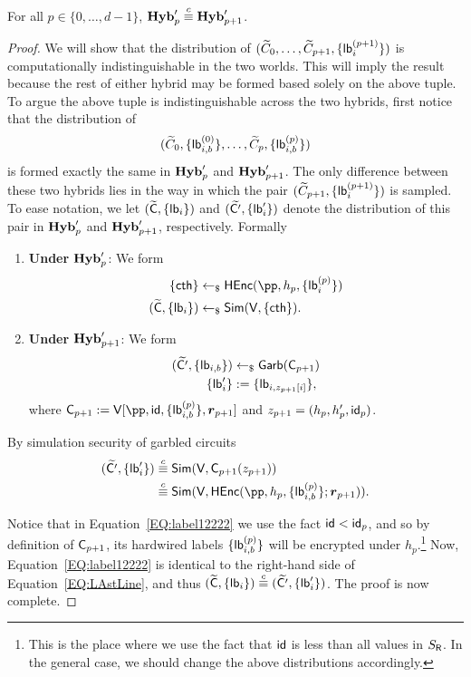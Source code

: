  \begin{lemma}
 For all $p \in \{0, \dots, d-1\}$, $\mathsf{\mathbf{Hyb}}'_p \stackrel{c}{\equiv} \mathsf{\mathbf{Hyb}}'_{p+1}$.
 \end{lemma}
 \begin{proof}
 We will show that the distribution of $(\widetilde{C}_0, \dots, \widetilde{C}_{p+1} , \{\mathsf{lb}^{(p+1)}_i \})$ is computationally indistinguishable in the two worlds.  This will imply the result because  the rest of either hybrid may be formed based solely on the above tuple. To argue the above tuple is indistinguishable across the two hybrids, first notice that the distribution of $$(\widetilde{C}_0, \{\mathsf{lb}^{(0)}_{i,b} \} , \dots, \widetilde{C}_p, \{\mathsf{lb}^{(p)}_{i,b} \})$$ is formed exactly the same in $\mathsf{\mathbf{Hyb}}'_p$ and $\mathsf{\mathbf{Hyb}}'_{p+1}$. The only difference between these two hybrids lies in the way in which the pair $(\widetilde{C}_{p+1}, \{\mathsf{lb}^{(p+1)}_i\})$ is sampled. To ease notation, we let $(\widetilde{\mathsf{C}} , \{\mathsf{lb}_i \} )$ and $(\widetilde{\mathsf{C}'} , \{\mathsf{lb}'_i \} )$ denote the distribution of this pair in $\mathsf{\mathbf{Hyb}}'_p$ and $\mathsf{\mathbf{Hyb}}'_{p+1}$, respectively. Formally  
 
 \begin{enumerate}
     \item \textbf{Under $\mathsf{\mathbf{Hyb}}'_p$}: We form %
     \begin{align}
         \{\cth\} &\pick \HEnc(\pp , h_{p} , \{\lb_{i}^{(p)} \}  ) \\
            (\wt{\al{C}} , \{\lb_{i} \}) &\pick \Sim(\al{V} , \{\cth\}) \label{EQ:LAstLine}.
     \end{align}
     \item \textbf{Under $\mathsf{\mathbf{Hyb}}'_{p+1}$}: We form
     \begin{align*}
      (\widetilde{\mathsf{C}'} , \{\mathsf{lb}_{i,b} \}) &\leftarrow_\$ \mathsf{Garb}(\mathsf{C}_{p+1}) \\
      \{\mathsf{lb}'_i \} &:= \{\mathsf{lb}_{i,z_{p+1}[i]} \},
     \end{align*}
     where $\al{C}_{p+1} := \al{V}[\pp , \id,  \{\lb_{i,b}^{(p)}\},   \bo{r}_{p+1}]$ and $z_{p+1} = (h_p, h'_p , \mathsf{id}_p)$.
 \end{enumerate}
 By simulation security of garbled circuits
 \begin{align}
     (\wt{\al{C}'} , \{\lb'_i \} ) &\comp \Sim(\al{V} , \al{C}_{p+1}(z_{p+1}) ) \label{EQ:label1111} \\
     &\comp  \Sim(\al{V} , \HEnc(\pp, h_p, \{\lb_{i,b}^{(p)}\} ; \bo{r}_{p+1} ) ). \label{EQ:label12222}
 \end{align}



 
 Notice that in Equation~\ref{EQ:label12222} we use the fact $\mathsf{id} < \mathsf{id}_p$, and so by definition of $\mathsf{C}_{p+1}$, its hardwired labels $\{\mathsf{lb}_{i,b}^{(p)}\}$ will be encrypted under $h_p$.\footnote{This is the place where we use the fact that $\mathsf{id}$ is less than all values in $S_{\mathsf{R}}$. In the general case, we should change the above distributions accordingly.}  Now, Equation~\ref{EQ:label12222} is identical to the right-hand side of Equation~\ref{EQ:LAstLine}, and thus $(\widetilde{\mathsf{C}} , \{\mathsf{lb}_i \} ) \stackrel{c}{\equiv} (\widetilde{\mathsf{C}'} , \{\mathsf{lb}'_i \} )$.  The proof is now complete.
 \end{proof}

